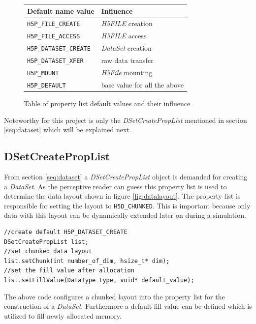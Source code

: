 \begin{figure}[ht!]
\centering
\begin{tabular}{|l|l|}
\hline
Default name value&Influence\\
\hline
\texttt{H5P\_FILE\_CREATE}&\textit{H5FILE} creation\\
\texttt{H5P\_FILE\_ACCESS}&\textit{H5FILE} access\\
\texttt{H5P\_DATASET\_CREATE}&\textit{DataSet} creation\\
\texttt{H5P\_DATASET\_XFER}&raw data transfer\\
\texttt{H5P\_MOUNT}&\textit{H5File} mounting\\
\texttt{H5P\_DEFAULT}&base value for all the above\\
\hline
\end{tabular}
\caption{Table of property list default values and their influence}
\label{table:default}
\end{figure}

Noteworthy for this project is only the \textit{DSetCreatePropList} mentioned in section \ref{seq:dataset} which will be explained next.

\subsection{DSetCreatePropList}
\label{seq:dscpl}
From section \ref{seq:dataset} a \textit{DSetCreatePropList} object is demanded for creating a \textit{DataSet}. As the perceptive reader can guess this property list is used to determine the data layout shown in figure \ref{fig:datalayout}. The property list is responsible for setting the layout to \texttt{H5D\_CHUNKED}. This is important because only data with this layout can be dynamically extended later on during a simulation. 
\begin{lstlisting}
//create default H5P_DATASET_CREATE
DSetCreatePropList list;
//set chunked data layout
list.setChunk(int number_of_dim, hsize_t* dim);
//set the fill value after allocation
list.setFillValue(DataType type, void* default_value);
\end{lstlisting}
The above code configures a chunked layout into the property list for the construction of a \textit{DataSet}. Furthermore a default fill value can be defined which is utilized to fill newly allocated memory.

